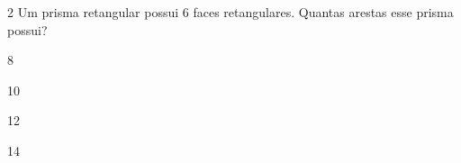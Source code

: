 

\num{2} Um prisma retangular possui 6 faces retangulares. Quantas arestas
esse prisma possui?

\begin{escolha}
\item 8
\item 10
\item 12
\item 14
\end{escolha}



